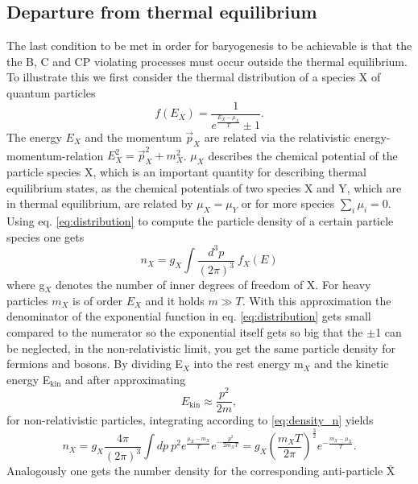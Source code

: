 \subsection{Departure from thermal equilibrium}
The last condition to be met in order for baryogenesis to be achievable is that the the B, C and CP violating processes must occur outside the thermal equilibrium. To illustrate this we first consider the thermal distribution of a species X of quantum particles
\begin{equation}
	f(E_X)=\frac{1}{e^{\frac{E_X-\mu_X}{T}}\pm1}.
	\label{eq:distribution}
\end{equation}
The energy $E_X$ and the momentum $\vec{p}_X$ are related via the relativistic energy-momentum-relation $E_X^2=\vec{p}_X^2+m_X^2$. $\mu_X$ describes the chemical potential of the particle species X, which is an important quantity for describing thermal equilibrium states, as the chemical potentials of two species X and Y, which are in thermal equilibrium, are related by $\mu_X=\mu_Y$ or for more species $\sum_i\mu_i=0$.\newline\indent
Using eq. \eqref{eq:distribution} to compute the particle density of a certain particle species one gets 
\begin{equation}
	n_X=g_X\int\frac{d^3p}{(2\pi)^3}\:f_X(E)
	\label{eq:density_n}
\end{equation}
where g$_X$ denotes the number of inner degrees of freedom of X. \newline\indent
For heavy particles $m_X$ is of order $E_X$ and it holds $m\gg T$. With this approximation the denominator of the exponential function in eq. \eqref{eq:distribution} gets small compared to the numerator so the exponential itself gets so big that the $\pm$1 can be neglected, in the non-relativistic limit, you get the same particle density for fermions and bosons. By dividing E$_X$ into the rest energy m$_X$ and the kinetic energy E$_{\text{kin}}$ and after approximating
\begin{equation}
	E_{\text{kin}}\approx\frac{p^2}{2m},
\end{equation}
for non-relativistic particles, integrating according to \eqref{eq:density_n} yields
\begin{equation}
n_X=g_X\frac{4\pi}{(2\pi)^3}\int dp\:p^2e^\frac{\mu_X-m_X}{T}e^{-\frac{p^2}{2m_XT}}=g_X\left(\frac{m_XT}{2\pi}\right)^\frac{3}{2}e^{-\frac{m_X-\mu_X}{T}}.
\label{eq:numerX}
\end{equation}
Analogously one gets the number density for the corresponding anti-particle $\bar{\text{X}}$
